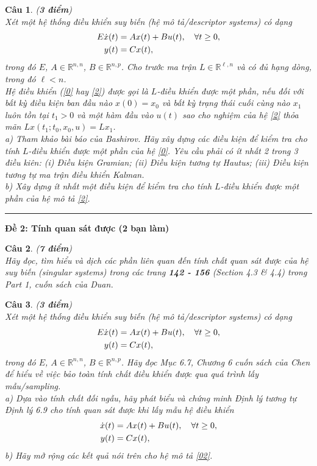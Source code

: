 \documentclass[11pt]{article}
\newtheorem{bt}{Câu}
\newcommand{\RR}{\mathbb R}
\begin{document}
\begin{bt}(\textbf{3 điểm}) \\
Xét một hệ thống điều khiển suy biến (hệ mô tả/descriptor systems) có dạng 
%
\begin{align}\label{2}
	E \dot{x}(t) &= A x(t) + B u(t), \quad \forall t\geq 0,  \\
	y(t) &=  C x(t), \notag
\end{align}
%
trong đó $E$, $A \in \RR^{n,n}$, $B \in \RR^{n,p}$. Cho trước ma trận $L \in \RR^{\ell,n}$ và có đủ hạng dòng, trong đó $\ell < n$. \\
Hệ điều khiển (\eqref{0} hay \eqref{2}) được gọi là $L$-điều khiển được một phần, nếu đối với bất kỳ điều kiện ban đầu nào $x(0) = x_0$ và bất kỳ trạng thái cuối cùng nào $x_1$ luôn tồn tại $t_1 > 0$ và một hàm đầu vào $u(t)$ sao cho nghiệm của hệ \eqref{2} thỏa mãn $L x(t_1;t_0,x_0,u) = L x_1$.\\  
a) Tham khảo bài báo của Bashirov. Hãy xây dựng các điều kiện để kiểm tra cho tính $L$-điều khiển được một phần của hệ \eqref{0}. Yêu cầu phải có ít nhất 2 trong 3 điều kiên: (i) Điều kiện Gramian; (ii) Điều kiện tương tự Hautus; (iii) Điều kiện tương tự ma trận điều khiển Kalman. \\
b) Xây dựng ít nhất một điều kiện để kiểm tra cho tính $L$-điều khiển được một phần của hệ mô tả \eqref{2}.
\end{bt}

\hrule

\begin{center}
	{\bf Đề 2: Tính quan sát được (2 bạn làm)}
\end{center}

\begin{bt}(\textbf{7 điểm}) \\
Hãy đọc, tìm hiểu và dịch các phần liên quan đến tính chất quan sát được của hệ suy biến (singular systems) trong các trang \textbf{142 - 156} (Section 4.3 \& 4.4) trong Part 1, cuốn sách của Duan. 
\end{bt}

\begin{bt}(\textbf{3 điểm}) \\
	Xét một hệ thống điều khiển suy biến (hệ mô tả/descriptor systems) có dạng 
	\begin{align}\label{02}
		E \dot{x}(t) &= A x(t) + B u(t), \quad \forall t\geq 0,  \\
		y(t) &=  C x(t), \notag
	\end{align}
	trong đó $E$, $A \in \RR^{n,n}$, $B \in \RR^{n,p}$. Hãy đọc Mục 6.7, Chương 6 cuốn sách của Chen để hiểu về việc bảo toàn tính chất điều khiển được qua quá trình lấy mẫu/sampling. \\
	a) Dựa vào tính chất đối ngẫu, hãy phát biểu và chứng minh Định lý tương tự Định lý 6.9 cho tính quan sát được khi lấy mẫu hệ điều khiển
	\begin{align}\label{00}
		\dot{x}(t) &= A x(t) + B u(t), \quad \forall t\geq 0, \\
		y(t) &=  C x(t), \notag
	\end{align}
	\noindent b) Hãy mở rộng các kết quả nói trên cho hệ mô tả \eqref{02}.
\end{bt}
\end{document}
